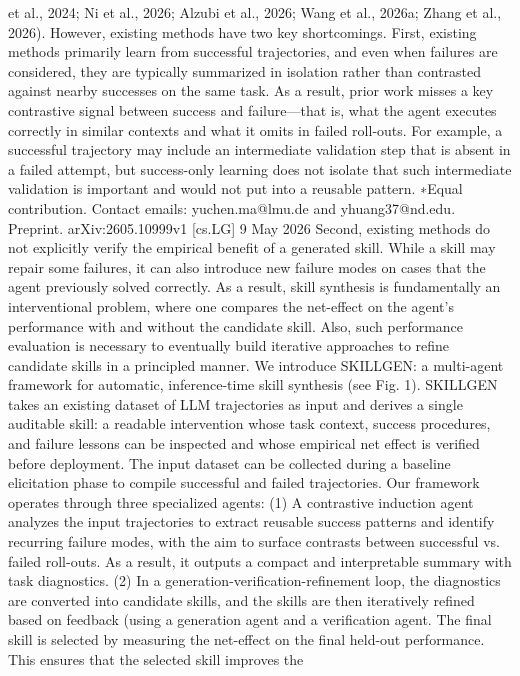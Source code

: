 et al., 2024; Ni et al., 2026; Alzubi et al., 2026; Wang et al., 2026a; Zhang et al., 2026). However,
existing methods have two key shortcomings. First, existing methods primarily learn from successful
trajectories, and even when failures are considered, they are typically summarized in isolation rather
than contrasted against nearby successes on the same task. As a result, prior work misses a key
contrastive signal between success and failure—that is, what the agent executes correctly in similar
contexts and what it omits in failed roll-outs. For example, a successful trajectory may include
an intermediate validation step that is absent in a failed attempt, but success-only learning does
not isolate that such intermediate validation is important and would not put into a reusable pattern.
∗Equal contribution. Contact emails: yuchen.ma@lmu.de and yhuang37@nd.edu.
Preprint.
arXiv:2605.10999v1  [cs.LG]  9 May 2026
Second, existing methods do not explicitly verify the empirical benefit of a generated skill. While
a skill may repair some failures, it can also introduce new failure modes on cases that the agent
previously solved correctly. As a result, skill synthesis is fundamentally an interventional problem,
where one compares the net-effect on the agent’s performance with and without the candidate skill.
Also, such performance evaluation is necessary to eventually build iterative approaches to refine
candidate skills in a principled manner.
We introduce SKILLGEN: a multi-agent framework for automatic, inference-time skill synthesis
(see Fig. 1). SKILLGEN takes an existing dataset of LLM trajectories as input and derives a single
auditable skill: a readable intervention whose task context, success procedures, and failure lessons
can be inspected and whose empirical net effect is verified before deployment. The input dataset can
be collected during a baseline elicitation phase to compile successful and failed trajectories. Our
framework operates through three specialized agents: (1) A contrastive induction agent analyzes
the input trajectories to extract reusable success patterns and identify recurring failure modes, with
the aim to surface contrasts between successful vs. failed roll-outs. As a result, it outputs a compact
and interpretable summary with task diagnostics. (2) In a generation-verification-refinement loop,
the diagnostics are converted into candidate skills, and the skills are then iteratively refined based on
feedback (using a generation agent and a verification agent. The final skill is selected by measuring
the net-effect on the final held-out performance. This ensures that the selected skill improves the
